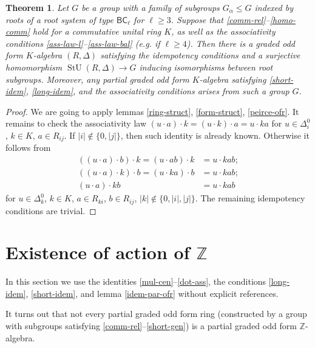 \documentclass{article}
\newtheorem{theorem}{Theorem}
\theoremstyle{definition}
\DeclareMathOperator\stunit{StU}
\begin{document}
\begin{theorem} \label{coord-cryst}
    Let \(G\) be a group with a family of subgroups \(G_\alpha \leq G\) indexed by roots of a root system of type \(\mathsf{BC}_\ell\) for \(\ell \geq 3\). Suppose that \ref{comm-rel}--\ref{homo-comm} hold for a commutative unital ring \(K\), as well as the associativity conditions \ref{ass-law-l}--\ref{ass-law-bal} (e.g. if \(\ell \geq 4\)). Then there is a graded odd form \(K\)-algebra \((R, \Delta)\) satisfying the idempotency conditions and a surjective homomorphism \(
        \stunit(R, \Delta) \to G
    \) inducing isomorphisms between root subgroups. Moreover, any partial graded odd form \(K\)-algebra satisfying \ref{short-idem}, \ref{long-idem}, and the associativity conditions arises from such a group \(G\).
\end{theorem}
\begin{proof}
    We are going to apply lemmas \ref{ring-struct}, \ref{form-struct}, \ref{peirce-ofr}. It remains to check the associativity law \(
        (u \cdot a) \cdot k
        =
        (u \cdot k) \cdot a
        =
        u \cdot ka
    \) for \(u \in \Delta^0_i\), \(k \in K\), \(a \in R_{ij}\). If \(|i| \notin \{0, |j|\}\), then such identity is already known. Otherwise it follows from
    \begin{align*}
        ((u \cdot a) \cdot b) \cdot k
        =
        (u \cdot ab) \cdot k
        &=
        u \cdot kab;
        \\
        ((u \cdot a) \cdot k) \cdot b
        =
        (u \cdot ka) \cdot b
        &=
        u \cdot kab;
        \\
        (u \cdot a) \cdot kb
        &=
        u \cdot kab
    \end{align*}
    for \(u \in \Delta^0_k\), \(k \in K\), \(a \in R_{ki}\), \(b \in R_{ij}\), \(|k| \notin \{0, |i|, |j|\}\). The remaining idempotency conditions are trivial.
\end{proof}



\section{Existence of action of \(\mathbb Z\)}

In this section we use the identities \ref{mul-cen}--\ref{dot-ass}, the conditions \ref{long-idem}, \ref{short-idem}, and lemma \ref{idem-par-ofr} without explicit references.

It turns out that not every partial graded odd form ring (constructed by a group with subgroups satisfying \ref{comm-rel}--\ref{short-gen}) is a partial graded odd form \(\mathbb Z\)-algebra.
\end{document}
